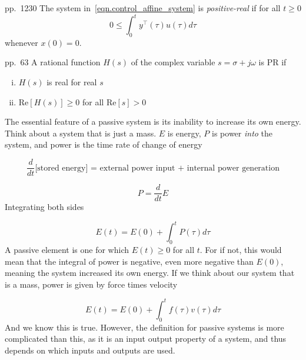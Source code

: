 \begin{defn-dan}\cite{byrnes.passivitiy.1991}
  pp.~1230
  The system in~\eqref{eqn.control_affine_system} is \textit{positive-real} if for all $t\geq0$
  \begin{equation*}
    0\leq\int_{0}^{t}y^{\top}(\tau)u(\tau)d\tau
  \end{equation*}
  whenever $x(0)=0$.
\end{defn-dan}

\begin{defn-dan}\cite{narendra.stable.2005}
  pp.~63
  A rational function $H(s)$ of the complex variable $s=\sigma+j\omega$ is PR if
  \begin{enumerate}[(i)]
    \item{$H(s)$ is real for real $s$}
    \item{$\text{Re}[H(s)]\geq0$ for all $\text{Re}[s]>0$}
  \end{enumerate}
\end{defn-dan}

The essential feature of a passive system is its inability to increase its own energy.\cite{terrell.stability.2009} Think about a system that is just a mass.
$E$ is energy, $P$ is power \textit{into} the system, and power is the time rate of change of energy

\begin{equation*}
  \frac{d}{dt}\text{[stored energy] = external power input + internal power generation}
\end{equation*}

\begin{equation*}
  P=\frac{d}{dt}E
\end{equation*}
Integrating both sides

\begin{equation*}
  E(t)=E(0)+\int_{0}^{t}P(\tau)d\tau
\end{equation*}
A passive element is one for which $E(t)\geq0$ for all $t$.
For if not, this would mean that the integral of power is negative, even more negative than $E(0)$, meaning the system increased its own energy.
If we think about our system that is a mass, power is given by force times velocity

\begin{equation*}
  E(t)=E(0)+\int_{0}^{t}f(\tau)v(\tau)d\tau
\end{equation*}
And we know this is true.
However, the definition for passive systems is more complicated than this, as it is an input output property of a system, and thus depends on which inputs and outputs are used.

